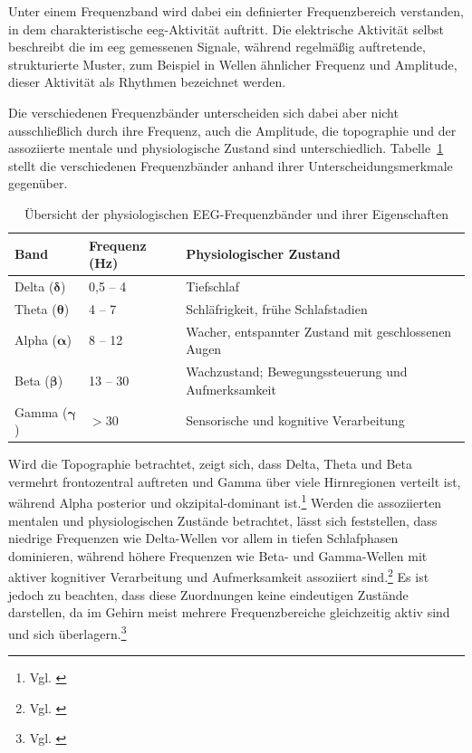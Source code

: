 Unter einem Frequenzband wird dabei ein definierter Frequenzbereich verstanden, in dem charakteristische \acrshort{eeg}-Aktivität auftritt. Die elektrische Aktivität selbst beschreibt die im \acrshort{eeg} gemessenen Signale, während regelmäßig auftretende, strukturierte Muster, zum Beispiel in Wellen ähnlicher Frequenz und Amplitude, dieser Aktivität als Rhythmen bezeichnet werden.

Die verschiedenen Frequenzbänder unterscheiden sich dabei aber nicht ausschließlich durch ihre Frequenz, auch die Amplitude, die \gls{topographie} und der assoziierte mentale und physiologische Zustand sind unterschiedlich. Tabelle~\ref{tab:frequenzbaender} stellt die verschiedenen Frequenzbänder anhand ihrer Unterscheidungsmerkmale gegenüber.

\begin{table}[htbp]
\centering
\caption{Übersicht der physiologischen EEG-Frequenzbänder und ihrer Eigenschaften}
\label{tab:frequenzbaender}
\begin{tabular}{ll p{7.5cm}}
\toprule
\textbf{Band} & \textbf{Frequenz (Hz)} & \textbf{Physiologischer Zustand} \\
\midrule
Delta ($\boldsymbol{\delta}$) & 0,5 -- 4   & Tiefschlaf \\
Theta ($\boldsymbol{\theta}$) & 4 -- 7     & Schläfrigkeit, frühe Schlafstadien \\
Alpha ($\boldsymbol{\alpha}$) & 8 -- 12    & Wacher, entspannter Zustand mit geschlossenen Augen \\
Beta ($\boldsymbol{\beta}$)   & 13 -- 30   & Wachzustand; Bewegungssteuerung und Aufmerksamkeit \\
Gamma ($\boldsymbol{\gamma}$) & $> 30$     & Sensorische und kognitive Verarbeitung \\
\bottomrule
\end{tabular}
\end{table}
Wird die Topographie betrachtet, zeigt sich, dass Delta, Theta und Beta vermehrt frontozentral auftreten und Gamma über viele Hirnregionen verteilt ist, während Alpha \gls{posterior} und okzipital-dominant ist.\footnote{Vgl. \cite{nayak_waveforms}}
Werden die assoziierten mentalen und physiologischen Zustände betrachtet, lässt sich feststellen, dass niedrige Frequenzen wie Delta-Wellen vor allem in tiefen Schlafphasen dominieren, während höhere Frequenzen wie Beta- und Gamma-Wellen mit aktiver kognitiver Verarbeitung und Aufmerksamkeit assoziiert sind.\footnote{Vgl. \cite{nayak_waveforms}} Es ist jedoch zu beachten, dass diese Zuordnungen keine eindeutigen Zustände darstellen, da im Gehirn meist mehrere Frequenzbereiche gleichzeitig aktiv sind und sich überlagern.\footnote{Vgl. \cite[S.~R82]{biasiucci2019}}


